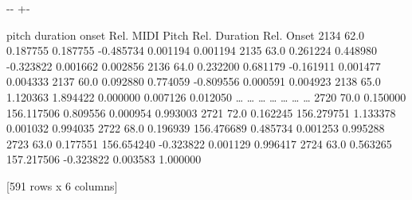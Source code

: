 \documentclass[letterpaper,10pt,english]{sphinxmanual}
\newlength\nbsphinxcodecellspacing
\begin{document}
{

\kern-\sphinxverbatimsmallskipamount\kern-\baselineskip
\kern+\FrameHeightAdjust\kern-\fboxrule
\vspace{\nbsphinxcodecellspacing}

\begin{sphinxVerbatim}[commandchars=\\\{\}]
\llap{\color{nbsphinxout}[48]:\,\hspace{\fboxrule}\hspace{\fboxsep}}      pitch  duration       onset  Rel. MIDI Pitch  Rel. Duration  Rel. Onset
2134   62.0  0.187755    0.187755        -0.485734       0.001194    0.001194
2135   63.0  0.261224    0.448980        -0.323822       0.001662    0.002856
2136   64.0  0.232200    0.681179        -0.161911       0.001477    0.004333
2137   60.0  0.092880    0.774059        -0.809556       0.000591    0.004923
2138   65.0  1.120363    1.894422         0.000000       0.007126    0.012050
{\ldots}     {\ldots}       {\ldots}         {\ldots}              {\ldots}            {\ldots}         {\ldots}
2720   70.0  0.150000  156.117506         0.809556       0.000954    0.993003
2721   72.0  0.162245  156.279751         1.133378       0.001032    0.994035
2722   68.0  0.196939  156.476689         0.485734       0.001253    0.995288
2723   63.0  0.177551  156.654240        -0.323822       0.001129    0.996417
2724   63.0  0.563265  157.217506        -0.323822       0.003583    1.000000

[591 rows x 6 columns]
\end{sphinxVerbatim}
}

{
\begin{sphinxVerbatim}[commandchars=\\\{\}]
\llap{\color{nbsphinxin}[53]:\,\hspace{\fboxrule}\hspace{\fboxsep}}   

   
\end{sphinxVerbatim}
}
\end{document}
